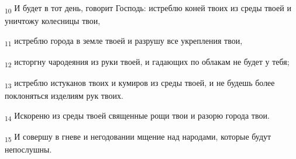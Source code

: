 \begin{tcolorbox}
\textsubscript{10} И будет в тот день, говорит Господь: истреблю коней твоих из среды твоей и уничтожу колесницы твои,
\end{tcolorbox}
\begin{tcolorbox}
\textsubscript{11} истреблю города в земле твоей и разрушу все укрепления твои,
\end{tcolorbox}
\begin{tcolorbox}
\textsubscript{12} исторгну чародеяния из руки твоей, и гадающих по облакам не будет у тебя;
\end{tcolorbox}
\begin{tcolorbox}
\textsubscript{13} истреблю истуканов твоих и кумиров из среды твоей, и не будешь более поклоняться изделиям рук твоих.
\end{tcolorbox}
\begin{tcolorbox}
\textsubscript{14} Искореню из среды твоей священные рощи твои и разорю города твои.
\end{tcolorbox}
\begin{tcolorbox}
\textsubscript{15} И совершу в гневе и негодовании мщение над народами, которые будут непослушны.
\end{tcolorbox}
